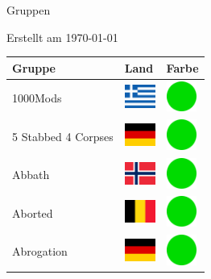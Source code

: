 \documentclass[12pt, a4paper, twoside]{report}
\begin{document}
	
	\begin{center}
		\vspace{1cm}
		{\Large Gruppen\par}
		
		{\large Erstellt am \today\par}
	\end{center}
	
	\begin{center}
		\begin{longtable}{|p{5cm}|p{2cm}|p{2cm}|} 
			
			\hline
			\rowcolor{lightgray} Gruppe & Land & Farbe \\ \hline
			\endhead
1000Mods & \includegraphics[width=1cm]{4x3/gr} & \includegraphics[width=1cm]{likes/y} \\ \hline
5 Stabbed 4 Corpses & \includegraphics[width=1cm]{4x3/de} & \includegraphics[width=1cm]{likes/y} \\ \hline
Abbath & \includegraphics[width=1cm]{4x3/no} & \includegraphics[width=1cm]{likes/y} \\ \hline
Aborted & \includegraphics[width=1cm]{4x3/be} & \includegraphics[width=1cm]{likes/y} \\ \hline
Abrogation & \includegraphics[width=1cm]{4x3/de} & \includegraphics[width=1cm]{likes/y} \\ \hline

\end{longtable}
\end{center}
\end{document}
